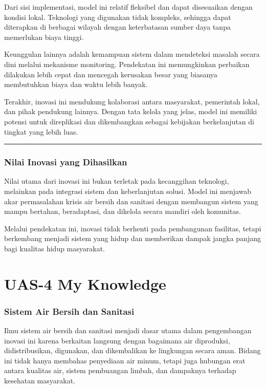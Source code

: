 \documentclass[
  letterpaper,
  DIV=11,
  numbers=noendperiod]{scrreprt}
\begin{document}
Dari sisi implementasi, model ini relatif fleksibel dan dapat
disesuaikan dengan kondisi lokal. Teknologi yang digunakan tidak
kompleks, sehingga dapat diterapkan di berbagai wilayah dengan
keterbatasan sumber daya tanpa memerlukan biaya tinggi.

Keunggulan lainnya adalah kemampuan sistem dalam mendeteksi masalah
secara dini melalui mekanisme monitoring. Pendekatan ini memungkinkan
perbaikan dilakukan lebih cepat dan mencegah kerusakan besar yang
biasanya membutuhkan biaya dan waktu lebih banyak.

Terakhir, inovasi ini mendukung kolaborasi antara masyarakat, pemerintah
lokal, dan pihak pendukung lainnya. Dengan tata kelola yang jelas, model
ini memiliki potensi untuk direplikasi dan dikembangkan sebagai
kebijakan berkelanjutan di tingkat yang lebih luas.

\begin{center}\rule{0.5\linewidth}{0.5pt}\end{center}

\subsection{Nilai Inovasi yang
Dihasilkan}\label{nilai-inovasi-yang-dihasilkan}

Nilai utama dari inovasi ini bukan terletak pada kecanggihan teknologi,
melainkan pada integrasi sistem dan keberlanjutan solusi. Model ini
menjawab akar permasalahan krisis air bersih dan sanitasi dengan
membangun sistem yang mampu bertahan, beradaptasi, dan dikelola secara
mandiri oleh komunitas.

Melalui pendekatan ini, inovasi tidak berhenti pada pembangunan
fasilitas, tetapi berkembang menjadi sistem yang hidup dan memberikan
dampak jangka panjang bagi kualitas hidup masyarakat.


\chapter{UAS-4 My Knowledge}\label{uas-4-my-knowledge}

\subsection{Sistem Air Bersih dan
Sanitasi}\label{sistem-air-bersih-dan-sanitasi}

Ilmu sistem air bersih dan sanitasi menjadi dasar utama dalam
pengembangan inovasi ini karena berkaitan langsung dengan bagaimana air
diproduksi, didistribusikan, digunakan, dan dikembalikan ke lingkungan
secara aman. Bidang ini tidak hanya membahas penyediaan air minum,
tetapi juga hubungan erat antara kualitas air, sistem pembuangan limbah,
dan dampaknya terhadap kesehatan masyarakat.
\end{document}

